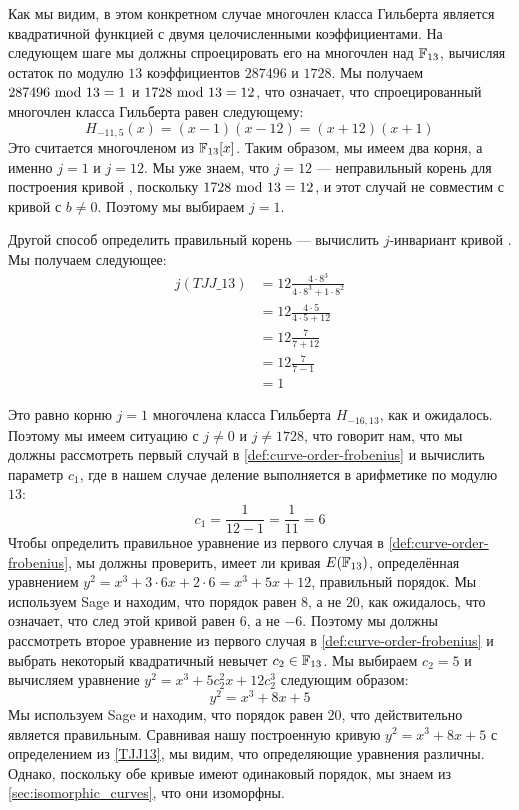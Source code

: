 \begin{example}
Как мы видим, в этом конкретном случае многочлен класса Гильберта является квадратичной функцией с двумя целочисленными коэффициентами. На следующем шаге мы должны спроецировать его на многочлен над $\mathbb{F}_{13}$, вычисляя остаток по модулю $13$ коэффициентов $287496$ и $1728$. Мы получаем $287496 \text{ mod } 13=1$ и $1728 \text{ mod } 13=12$, что означает, что спроецированный многочлен класса Гильберта равен следующему:
$$
H_{-11,5}(x)=(x-1)(x-12)= (x+12)(x+1)
$$ 
Это считается многочленом из $\mathbb{F}_{13}[x]$. Таким образом, мы имеем два корня, а именно $j=1$ и $j=12$. Мы уже знаем, что $j=12$ — неправильный корень для построения кривой , поскольку $1728 \text{ mod } 13=12$, и этот случай не совместим с кривой с $b\neq 0$. Поэтому мы выбираем $j=1$.

Другой способ определить правильный корень — вычислить $j$-инвариант кривой . Мы получаем следующее:
\begin{align*}
j(\mathit{TJJ\_13}) & = 12\frac{4\cdot 8^3}{4\cdot 8^3+ 1\cdot 8^2}\\
                    & = 12\frac{4\cdot 5}{4\cdot 5+ 12}\\
                    & = 12\frac{7}{7+ 12}\\
                    & = 12\frac{7}{7-1}\\
                    & = 1
\end{align*}

Это равно корню $j=1$ многочлена класса Гильберта $H_{-16,13}$, как и ожидалось. Поэтому мы имеем ситуацию с $j\neq 0$ и $j\neq 1728$, что говорит нам, что мы должны рассмотреть первый случай в \ref{def:curve-order-frobenius} и вычислить параметр $c_1$, где в нашем случае деление выполняется в арифметике по модулю $13$:
$$
c_1=\frac{1}{12-1} = \frac{1}{11} =6
$$
Чтобы определить правильное уравнение из первого случая в \ref{def:curve-order-frobenius}, мы должны проверить, имеет ли кривая $E(\mathbb{F}_{13})$, определённая уравнением  $y^2 = x^3 + 3\cdot 6 x + 2\cdot 6 = x^3 + 5x +12$, правильный порядок. Мы используем Sage и находим, что порядок равен $8$, а не $20$, как ожидалось, что означает, что след этой кривой равен $6$, а не $-6$. Поэтому мы должны рассмотреть второе уравнение из первого случая в \ref{def:curve-order-frobenius} и выбрать некоторый квадратичный невычет $c_2\in\mathbb{F}_{13}$. Мы выбираем $c_2=5$ и вычисляем уравнение  $y^2 = x^3 + 5 c_2^2 x + 12 c_2^3$ следующим образом:
$$
y^2 = x^3 + 8 x + 5
$$
Мы используем Sage и находим, что порядок равен $20$, что действительно является правильным. Сравнивая нашу построенную кривую $y^2 =  x^3 + 8x + 5$ с определением \TJJ{} из \examplename{} \ref{TJJ13}, мы видим, что определяющие уравнения различны. Однако, поскольку обе кривые имеют одинаковый порядок, мы знаем из \ref{sec:isomorphic_curves}, что они изоморфны.


\end{example}
